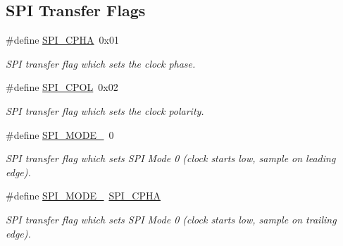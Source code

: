 \subsection*{S\+PI Transfer Flags}
\begin{DoxyCompactItemize}
\item 
\mbox{\label{group__SPILinux_ga49e8927a636f45641d6231ac63b9e598}} 
\#define \mbox{\hyperlink{group__SPILinux_ga49e8927a636f45641d6231ac63b9e598}{S\+P\+I\+\_\+\+C\+P\+HA}}~0x01
\begin{DoxyCompactList}\small\item\em S\+PI transfer flag which sets the clock phase. \end{DoxyCompactList}\item 
\mbox{\label{group__SPILinux_gad8e335b1f808bd7408d2aef2377adcb1}} 
\#define \mbox{\hyperlink{group__SPILinux_gad8e335b1f808bd7408d2aef2377adcb1}{S\+P\+I\+\_\+\+C\+P\+OL}}~0x02
\begin{DoxyCompactList}\small\item\em S\+PI transfer flag which sets the clock polarity. \end{DoxyCompactList}\item 
\mbox{\label{group__SPILinux_ga1ec07ad94d5f6276c1c0b41d0550fe52}} 
\#define \mbox{\hyperlink{group__SPILinux_ga1ec07ad94d5f6276c1c0b41d0550fe52}{S\+P\+I\+\_\+\+M\+O\+D\+E\+\_}}~0
\begin{DoxyCompactList}\small\item\em S\+PI transfer flag which sets S\+PI Mode 0 (clock starts low, sample on leading edge). \end{DoxyCompactList}\item 
\mbox{\label{group__SPILinux_gaf2af9f45539491c9753960535dc20fde}} 
\#define \mbox{\hyperlink{group__SPILinux_gaf2af9f45539491c9753960535dc20fde}{S\+P\+I\+\_\+\+M\+O\+D\+E\+\_}}~\mbox{\hyperlink{group__SPILinux_ga49e8927a636f45641d6231ac63b9e598}{S\+P\+I\+\_\+\+C\+P\+HA}}
\begin{DoxyCompactList}\small\item\em S\+PI transfer flag which sets S\+PI Mode 0 (clock starts low, sample on trailing edge). \end{DoxyCompactList}\item 
\mbox{\label{group__SPILinux_ga8fa3edd8616f8803490c93f09243a612}} 

\end{DoxyCompactItemize}
